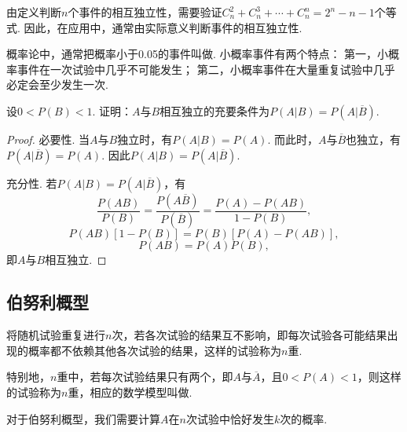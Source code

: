 由定义判断\(n\)个事件的相互独立性，需要验证\(C_n^2+C_n^3+\dotsb+C_n^n=2^n-n-1\)个等式.
因此，在应用中，通常由实际意义判断事件的相互独立性.

概率论中，通常把概率小于0.05的事件叫做.
小概率事件有两个特点：
第一，小概率事件在一次试验中几乎不可能发生；
第二，小概率事件在大量重复试验中几乎必定会至少发生一次.

\begin{example}
设\(0<P(B)<1\).
证明：\(A\)与\(B\)相互独立的充要条件为\(P(A \vert B) = P(A \vert \overline{B})\).
\begin{proof}
必要性.
当\(A\)与\(B\)独立时，有\(P(A \vert B) = P(A)\).
而此时，\(A\)与\(\overline{B}\)也独立，有\(P(A \vert \overline{B}) = P(A)\).
因此\(P(A \vert B) = P(A \vert \overline{B})\).

充分性.
若\(P(A \vert B) = P(A \vert \overline{B})\)，有\[
\frac{P(AB)}{P(B)}
= \frac{P(A\overline{B})}{P(\overline{B})}
= \frac{P(A)-P(AB)}{1-P(B)},
\]\[
P(AB) [1-P(B)] = P(B) [P(A)-P(AB)],
\]\[
P(AB) = P(A) P(B),
\]即\(A\)与\(B\)相互独立.
\end{proof}
\end{example}

\subsection{伯努利概型}
\begin{definition}
将随机试验重复进行\(n\)次，若各次试验的结果互不影响，即每次试验各可能结果出现的概率都不依赖其他各次试验的结果，这样的试验称为\(n\)重.

特别地，\(n\)重中，若每次试验结果只有两个，即\(A\)与\(\overline{A}\)，且\(0 < P(A) < 1\)，则这样的试验称为\(n\)重，相应的数学模型叫做.
\end{definition}

对于伯努利概型，我们需要计算\(A\)在\(n\)次试验中恰好发生\(k\)次的概率.

